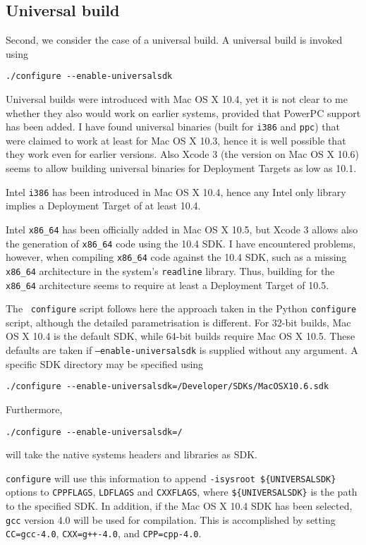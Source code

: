 \documentclass{article}[12pt,a4]
\begin{document}
\subsection{Universal build}

Second, we consider the case of a universal build.
A universal build is invoked using
\begin{verbatim}
./configure --enable-universalsdk
\end{verbatim}

Universal builds were introduced with Mac OS X 10.4, yet it is not clear to me whether they also
would work on earlier systems, provided that PowerPC support has been added.
I have found universal binaries (built for {\tt i386} and {\tt ppc}) that were claimed
to work at least for Mac OS X 10.3, hence it is well possible that they work even for earlier versions.
Also Xcode 3 (the version on Mac OS X 10.6) seems to allow building universal binaries for 
Deployment Targets as low as 10.1.

Intel {\tt i386} has been introduced in Mac OS X 10.4, hence any Intel only library implies a
Deployment Target of at least 10.4.

Intel {\tt x86\_64} has been officially added in Mac OS X 10.5, but Xcode 3 allows
also the generation of {\tt x86\_64} code using the 10.4 SDK.
I have encountered problems, however, when compiling {\tt x86\_64} code against the 
10.4 SDK, such as a missing {\tt x86\_64} architecture in the system's {\tt readline}
library.
Thus, building for the {\tt x86\_64} architecture seems to require at least a Deployment Target 
of 10.5.

The \this\ {\tt configure} script follows here the approach taken in the Python {\tt configure} script,
although the detailed parametrisation is different.
For 32-bit builds, Mac OS X 10.4 is the default SDK, while 64-bit builds require Mac OS X 10.5.
These defaults are taken if {\tt --enable-universalsdk} is supplied without any argument.
A specific SDK directory may be specified using
\begin{verbatim}
./configure --enable-universalsdk=/Developer/SDKs/MacOSX10.6.sdk
\end{verbatim}
Furthermore,
\begin{verbatim}
./configure --enable-universalsdk=/
\end{verbatim}
will take the native systems headers and libraries as SDK.

{\tt configure} will use this information to append {\tt -isysroot \$\{UNIVERSALSDK\}}
options to {\tt CPPFLAGS}, {\tt LDFLAGS} and {\tt CXXFLAGS},
where {\tt \$\{UNIVERSALSDK\}} is the path to the specified SDK.
In addition, if the Mac OS X 10.4 SDK has been selected, {\tt gcc} version 4.0 will be used 
for compilation.
This is accomplished by setting
{\tt CC=gcc-4.0},
{\tt CXX=g++-4.0}, and
{\tt CPP=cpp-4.0}.
\end{document}
